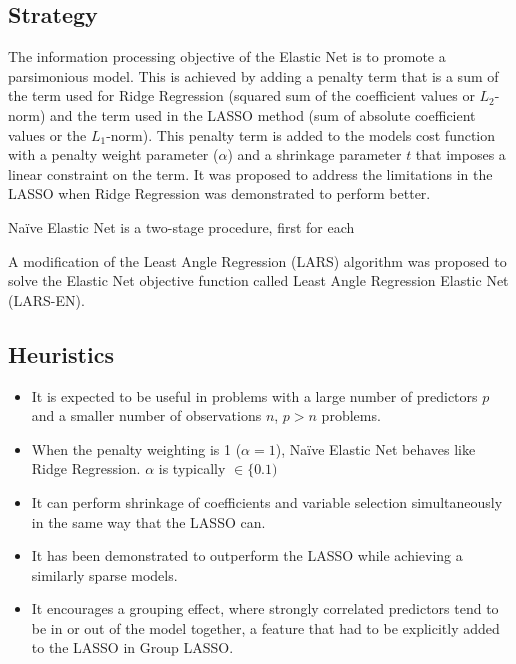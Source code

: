 \subsection{Strategy}
The information processing objective of the Elastic Net is to promote a parsimonious model.
This is achieved by adding a penalty term that is a sum of the term used for Ridge Regression (squared sum of the coefficient values or $L_2$-norm) and the term used in the LASSO method (sum of absolute coefficient values or the $L_1$-norm). This penalty term is added to the models cost function with a penalty weight parameter ($\alpha$) and a shrinkage parameter $t$ that imposes a linear constraint on the term. 
It was proposed to address the limitations in the LASSO when Ridge Regression was demonstrated to perform better. 

Na\"ive Elastic Net is a two-stage procedure, first for each 

A modification of the Least Angle Regression (LARS) algorithm was proposed to solve the Elastic Net objective function called Least Angle Regression Elastic Net (LARS-EN).

\subsection{Heuristics}

\begin{itemize}
	\item It is expected to be useful in problems with a large number of predictors $p$ and a smaller number of observations $n$, $p>n$ problems.
	\item When the penalty weighting is 1 ($\alpha=1$), Na\"ive Elastic Net behaves like Ridge Regression. $\alpha$ is typically $\in \{0.1)$
	\item It can perform shrinkage of coefficients and variable selection simultaneously in the same way that the LASSO can.
	\item It has been demonstrated to outperform the LASSO while achieving a similarly sparse models.
	\item It encourages a grouping effect, where strongly correlated predictors tend to be in or out of the model together, a feature that had to be explicitly added to the LASSO in Group LASSO.
\end{itemize}

